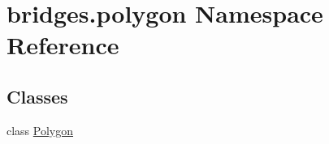 \hypertarget{namespacebridges_1_1polygon}{}\section{bridges.\+polygon Namespace Reference}
\label{namespacebridges_1_1polygon}
\subsection*{Classes}
\begin{DoxyCompactItemize}
\item 
class \mbox{\hyperlink{classbridges_1_1polygon_1_1_polygon}{Polygon}}
\end{DoxyCompactItemize}
